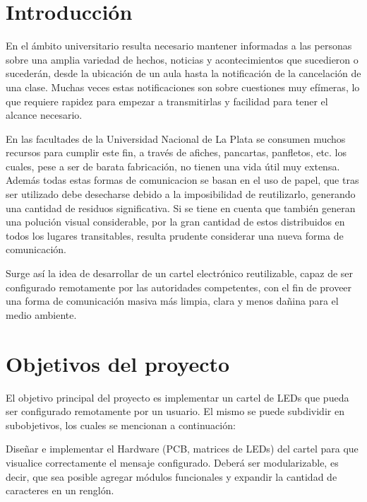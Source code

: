 \section{Introducción}
En el ámbito universitario resulta necesario mantener informadas a las personas sobre una amplia variedad de hechos, noticias y acontecimientos que sucedieron o sucederán, desde la ubicación de un aula hasta la notificación de la cancelación de una clase. Muchas veces estas notificaciones son sobre cuestiones muy efímeras, lo que requiere rapidez para empezar a transmitirlas y facilidad para tener el alcance necesario.

En las facultades de la Universidad Nacional de La Plata se consumen muchos recursos para cumplir este fin, a través de afiches, pancartas, panfletos, etc. los cuales, pese a ser de barata fabricación, no tienen una vida útil muy extensa. Además todas estas formas de comunicacion se basan en el uso de papel, que tras ser utilizado debe desecharse debido a la imposibilidad de reutilizarlo, generando una cantidad de residuos significativa. Si se tiene en cuenta que también generan una polución visual considerable, por la gran cantidad de estos distribuidos en todos los lugares transitables, resulta prudente considerar una nueva forma de comunicación.

Surge así la idea de desarrollar de un cartel electrónico reutilizable, capaz de ser configurado remotamente por las autoridades competentes, con el fin de proveer una forma de comunicación masiva más limpia, clara y menos dañina para el medio ambiente. 

\section{Objetivos del proyecto}
El objetivo principal del proyecto es implementar un cartel de LEDs que pueda ser configurado remotamente por un usuario.
El mismo se puede subdividir en subobjetivos, los cuales se mencionan a continuación:

Diseñar e implementar el Hardware (PCB, matrices de LEDs) del cartel para que visualice correctamente el mensaje configurado. Deberá ser modularizable, es decir, que sea posible agregar módulos funcionales y expandir la cantidad de caracteres en un renglón.

